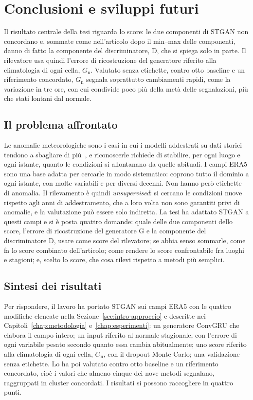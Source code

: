 \chapter{Conclusioni e sviluppi futuri}
\label{chap:conclusioni}

Il risultato centrale della tesi riguarda lo score: le due componenti di STGAN non concordano e, sommate come nell'articolo dopo il min--max delle componenti, danno di fatto la componente del discriminatore, D, che si spiega solo in parte. Il rilevatore usa quindi l'errore di ricostruzione del generatore riferito alla climatologia di ogni cella, $G_{\mathrm{n}}$. Valutato senza etichette, contro otto baseline e un riferimento concordato, $G_{\mathrm{n}}$ segnala soprattutto cambiamenti rapidi, come la variazione in tre ore, con cui condivide poco più della metà delle segnalazioni, più che stati lontani dal normale.

\section{Il problema affrontato}

Le anomalie meteorologiche sono i casi in cui i modelli addestrati su dati storici tendono a sbagliare di più~\cite{rasp2020weatherbench}, e riconoscerle richiede di stabilire, per ogni luogo e ogni istante, quanto le condizioni si allontanano da quelle abituali. I campi ERA5 sono una base adatta per cercarle in modo sistematico: coprono tutto il dominio a ogni istante, con molte variabili e per diversi decenni. Non hanno però etichette di anomalia. Il rilevamento è quindi \emph{unsupervised}: si cercano le condizioni nuove rispetto agli anni di addestramento, che a loro volta non sono garantiti privi di anomalie, e la valutazione può essere solo indiretta. La tesi ha adattato STGAN a questi campi e si è posta quattro domande: quale delle due componenti dello score, l'errore di ricostruzione del generatore G e la componente del discriminatore D, usare come score del rilevatore; se abbia senso sommarle, come fa lo score combinato dell'articolo; come rendere lo score confrontabile fra luoghi e stagioni; e, scelto lo score, che cosa rilevi rispetto a metodi più semplici.

\section{Sintesi dei risultati}
\label{sec:conc-sintesi}

Per rispondere, il lavoro ha portato STGAN sui campi ERA5 con le quattro modifiche elencate nella Sezione~\ref{sec:intro-approccio} e descritte nei Capitoli~\ref{chap:metodologia} e~\ref{chap:esperimenti}: un generatore ConvGRU che elabora il campo intero; un input riferito al normale stagionale, con l'errore di ogni variabile pesato secondo quanto essa cambia abitualmente; uno score riferito alla climatologia di ogni cella, $G_{\mathrm{n}}$, con il dropout Monte Carlo; una validazione senza etichette. Lo ha poi valutato contro otto baseline e un riferimento concordato, cioè i valori che almeno cinque dei nove metodi segnalano, raggruppati in cluster concordati. I risultati si possono raccogliere in quattro punti.

